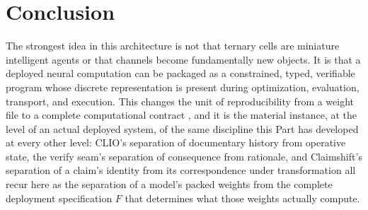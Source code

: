 \section{Conclusion}

The strongest idea in this architecture is not that ternary cells are miniature intelligent agents or that channels become fundamentally new objects. It is that a deployed neural computation can be packaged as a constrained, typed, verifiable program whose discrete representation is present during optimization, evaluation, transport, and execution. This changes the unit of reproducibility from a weight file to a complete computational contract \cite{reprobuilds,guix2015,beyer2016}, and it is the material instance, at the level of an actual deployed system, of the same discipline this Part has developed at every other level: CLIO's separation of documentary history from operative state, the verify seam's separation of consequence from rationale, and Claimshift's separation of a claim's identity from its correspondence under transformation all recur here as the separation of a model's packed weights from the complete deployment specification $F$ that determines what those weights actually compute.
